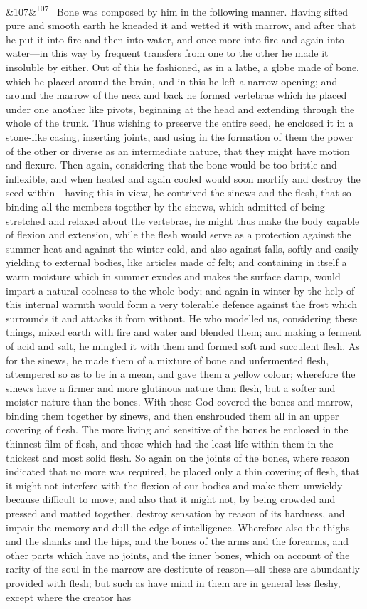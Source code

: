 \documentclass[12pt]{article}
\newcommand{\para}[1][]{\par\noindent\ifx&#1&\else\textsuperscript{\footnotesize #1}~\fi}
\begin{document}
\para[107] Bone was composed by him in the following manner. Having sifted pure and smooth earth he kneaded it and wetted it with marrow, and after that he put it into fire and then into water, and once more into fire and again into water---in this way by frequent transfers from one to the other he made it insoluble by either. Out of this he fashioned, as in a lathe, a globe made of bone, which he placed around the brain, and in this he left a narrow opening; and around the marrow of the neck and back he formed vertebrae which he placed under one another like pivots, beginning at the head and extending through the whole of the trunk. Thus wishing to preserve the entire seed, he enclosed it in a stone-like casing, inserting joints, and using in the formation of them the power of the other or diverse as an intermediate nature, that they might have motion and flexure. Then again, considering that the bone would be too brittle and inflexible, and when heated and again cooled would soon mortify and destroy the seed within---having this in view, he contrived the sinews and the flesh, that so binding all the members together by the sinews, which admitted of being stretched and relaxed about the vertebrae, he might thus make the body capable of flexion and extension, while the flesh would serve as a protection against the summer heat and against the winter cold, and also against falls, softly and easily yielding to external bodies, like articles made of felt; and containing in itself a warm moisture which in summer exudes and makes the surface damp, would impart a natural coolness to the whole body; and again in winter by the help of this internal warmth would form a very tolerable defence against the frost which surrounds it and attacks it from without. He who modelled us, considering these things, mixed earth with fire and water and blended them; and making a ferment of acid and salt, he mingled it with them and formed soft and succulent flesh. As for the sinews, he made them of a mixture of bone and unfermented flesh, attempered so as to be in a mean, and gave them a yellow colour; wherefore the sinews have a firmer and more glutinous nature than flesh, but a softer and moister nature than the bones. With these God covered the bones and marrow, binding them together by sinews, and then enshrouded them all in an upper covering of flesh. The more living and sensitive of the bones he enclosed in the thinnest film of flesh, and those which had the least life within them in the thickest and most solid flesh. So again on the joints of the bones, where reason indicated that no more was required, he placed only a thin covering of flesh, that it might not interfere with the flexion of our bodies and make them unwieldy because difficult to move; and also that it might not, by being crowded and pressed and matted together, destroy sensation by reason of its hardness, and impair the memory and dull the edge of intelligence. Wherefore also the thighs and the shanks and the hips, and the bones of the arms and the forearms, and other parts which have no joints, and the inner bones, which on account of the rarity of the soul in the marrow are destitute of reason---all these are abundantly provided with flesh; but such as have mind in them are in general less fleshy, except where the creator has 
\end{document}

